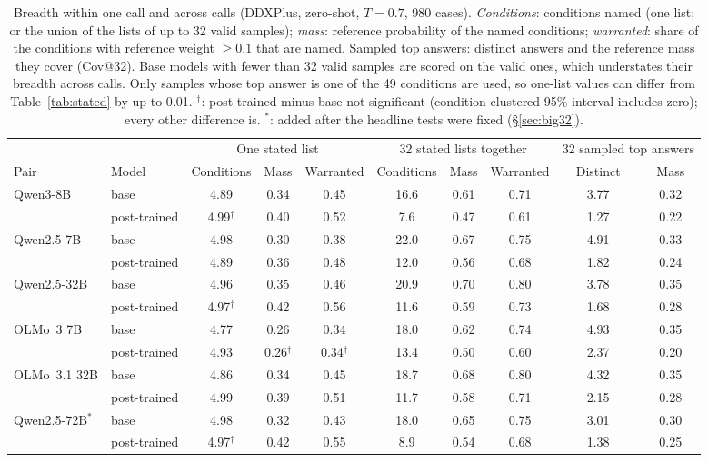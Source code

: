 \documentclass[wcp]{jmlr}
\begin{document}
\begin{table}[t]
\centering\small
\setlength{\tabcolsep}{3.5pt}
\begin{adjustbox}{max width=\linewidth}
\begin{tabular}{llcccccccc}
\toprule
 & & \multicolumn{3}{c}{One stated list} & \multicolumn{3}{c}{32 stated lists together} & \multicolumn{2}{c}{32 sampled top answers} \\
Pair & Model & Conditions & Mass & Warranted & Conditions & Mass & Warranted & Distinct & Mass \\
\midrule
Qwen3-8B & base & 4.89 & 0.34 & 0.45 & 16.6 & 0.61 & 0.71 & 3.77 & 0.32 \\
 & post-trained & 4.99$^{\dagger}$ & 0.40 & 0.52 & 7.6 & 0.47 & 0.61 & 1.27 & 0.22 \\
Qwen2.5-7B & base & 4.98 & 0.30 & 0.38 & 22.0 & 0.67 & 0.75 & 4.91 & 0.33 \\
 & post-trained & 4.89 & 0.36 & 0.48 & 12.0 & 0.56 & 0.68 & 1.82 & 0.24 \\
Qwen2.5-32B & base & 4.96 & 0.35 & 0.46 & 20.9 & 0.70 & 0.80 & 3.78 & 0.35 \\
 & post-trained & 4.97$^{\dagger}$ & 0.42 & 0.56 & 11.6 & 0.59 & 0.73 & 1.68 & 0.28 \\
OLMo~3 7B & base & 4.77 & 0.26 & 0.34 & 18.0 & 0.62 & 0.74 & 4.93 & 0.35 \\
 & post-trained & 4.93 & 0.26$^{\dagger}$ & 0.34$^{\dagger}$ & 13.4 & 0.50 & 0.60 & 2.37 & 0.20 \\
OLMo~3.1 32B & base & 4.86 & 0.34 & 0.45 & 18.7 & 0.68 & 0.80 & 4.32 & 0.35 \\
 & post-trained & 4.99 & 0.39 & 0.51 & 11.7 & 0.58 & 0.71 & 2.15 & 0.28 \\
Qwen2.5-72B$^{*}$ & base & 4.98 & 0.32 & 0.43 & 18.0 & 0.65 & 0.75 & 3.01 & 0.30 \\
 & post-trained & 4.97$^{\dagger}$ & 0.42 & 0.55 & 8.9 & 0.54 & 0.68 & 1.38 & 0.25 \\
\bottomrule
\end{tabular}
\end{adjustbox}
\caption{Breadth within one call and across calls (DDXPlus, zero-shot, $T{=}0.7$, 980 cases). \emph{Conditions}: conditions named (one list; or the union of the lists of up to 32 valid samples); \emph{mass}: reference probability of the named conditions; \emph{warranted}: share of the conditions with reference weight $\geq 0.1$ that are named. Sampled top answers: distinct answers and the reference mass they cover (Cov@32). Base models with fewer than 32 valid samples are scored on the valid ones, which understates their breadth across calls. Only samples whose top answer is one of the 49 conditions are used, so one-list values can differ from Table~\ref{tab:stated} by up to 0.01. $^{\dagger}$: post-trained minus base not significant (condition-clustered 95\% interval includes zero); every other difference is. $^{*}$: added after the headline tests were fixed (\S\ref{sec:big32}).}
\label{tab:breadth}
\end{table}
\end{document}
